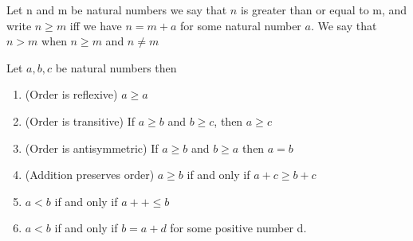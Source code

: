\documentclass[11pt]{report}
\begin{document}
\begin{definition}[Order]
	Let n and m be natural numbers we say that $n$ is greater than or equal to m, and write $n \geq m$ iff we have $n = m + a$ for some natural number $a$. We say that $n > m$ when $n \geq m$ and $n \neq m$
\end{definition}
\begin{prop}
	Let $a,b,c$ be natural numbers then
	\begin{enumerate}
		\item (Order is reflexive) $a \geq a$
		\item (Order is transitive) If $a \geq b$ and $b \geq c$, then $a \geq c$
		\item (Order is antisymmetric) If $a \geq b$ and $b \geq a$ then $a=b$
		\item (Addition preserves order) $a \geq b$ if and only if $a+c \geq b+c$
		\item $a<b$ if and only if $a++ \leq b$
		\item $a<b$ if and only if $b= a+d$ for some positive number d.
	\end{enumerate}
\end{prop}
\end{document}
